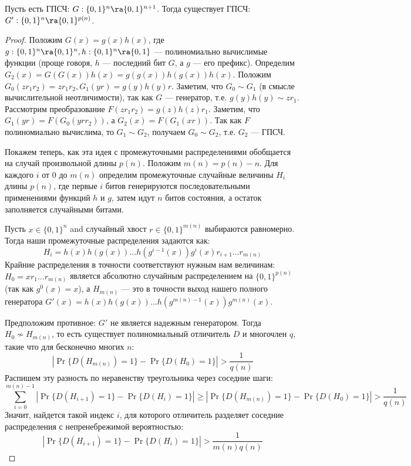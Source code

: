 \begin{lemma}
    Пусть есть ГПСЧ: \(G: \{0, 1\}^{n} \ra \{0, 1\}^{n + 1}\). Тогда существует ГПСЧ: \(G': \{0, 1\}^{n} \ra \{0, 1\}^{p(n)}\).
\end{lemma}
\begin{proof}
    Положим $G(x) = g(x)h(x)$, где $g: \{0, 1\}^{n} \ra \{0, 1\}^{n}, h: \{0, 1\}^{n} \ra \{0, 1\}$ — полиномиально вычислимые функции (проще говоря, $h$ — последний бит $G$, а $g$ — его префикс). Определим $G_2(x) = G(G(x))h(x) = g(g(x))h(g(x))h(x)$. Положим $G_0(zr_1r_2) = zr_1r_2, G_1(yr) = g(y)h(y)r$. Заметим, что $G_0 \sim G_1$ (в смысле вычислительной неотличимости), так как $G$ — генератор, т.е. $g(y)h(y) \sim zr_1$. Рассмотрим преобразование $F(zr_1r_2) = g(z)h(z)r_1$. Заметим, что $G_1(yr) = F(G_0(yrr_2))$, а $G_2(x) = F(G_1(xr))$. Так как $F$ полиномиально вычислима, то $G_1 \sim G_2$, получаем $G_0 \sim G_2$, т.е. $G_2$ — ГПСЧ.

    Покажем теперь, как эта идея с промежуточными распределениями обобщается на случай произвольной длины $p(n)$. Положим $m(n) = p(n) - n$. Для каждого $i$ от $0$ до $m(n)$ определим промежуточные случайные величины $H_i$ длины $p(n)$, где первые $i$ битов генерируются последовательными применениями функций $h$ и $g$, затем идут $n$ битов состояния, а остаток заполняется случайными битами.

    Пусть $x \in \{0,1\}^n$ and случайный хвост $r \in \{0,1\}^{m(n)}$ выбираются равномерно. Тогда наши промежуточные распределения задаются как:
    \[ H_i = h(x) h(g(x)) \dots h(g^{i-1}(x)) g^i(x) r_{i+1} \dots r_{m(n)} \]
    Крайние распределения в точности соответствуют нужным нам величинам: $H_0 = x r_1 \dots r_{m(n)}$ является абсолютно случайным распределением на $\{0,1\}^{p(n)}$ (так как $g^0(x) = x$), а $H_{m(n)}$ — это в точности выход нашего полного генератора $G'(x) = h(x) h(g(x)) \dots h(g^{m(n)-1}(x)) g^{m(n)}(x)$.

    Предположим противное: $G'$ не является надежным генератором. Тогда $H_0 \not\sim H_{m(n)}$, то есть существует полиномиальный отличитель $D$ и многочлен $q$, такие что для бесконечно многих $n$:
    \[ \left| \Pr\{D(H_{m(n)}) = 1\} - \Pr\{D(H_0) = 1\} \right| > \frac{1}{q(n)} \]
    Распишем эту разность по неравенству треугольника через соседние шаги:
    \[ \sum_{i=0}^{m(n)-1} \left| \Pr\{D(H_{i+1}) = 1\} - \Pr\{D(H_i) = 1\} \right| \ge \left| \Pr\{D(H_{m(n)}) = 1\} - \Pr\{D(H_0) = 1\} \right| > \frac{1}{q(n)} \]
    Значит, найдется такой индекс $i$, для которого отличитель разделяет соседние распределения с непренебрежимой вероятностью:
    \[ \left| \Pr\{D(H_{i+1}) = 1\} - \Pr\{D(H_i) = 1\} \right| > \frac{1}{m(n)q(n)} \]
    

\end{proof}
